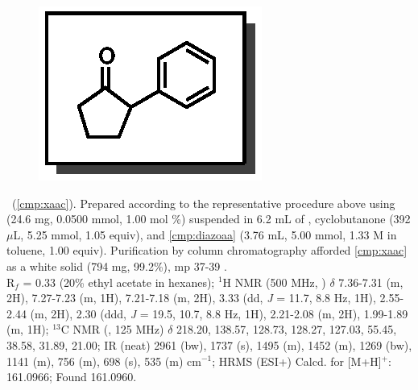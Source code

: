 \vspace{10pt}
\begin{figure}
  \vspace{-25pt}
  \begin{center}
    \includegraphics[scale=0.8]{chp_asymmetric/images/xaac}
  \end{center}
  \vspace{-30pt}
\end{figure}\noindent \textbf{\CMPxaac}\ (\ref{cmp:xaac}). Prepared
according to the representative procedure above using  (24.6 mg,
0.0500 mmol, 1.00 mol
\%) suspended in 6.2 mL of , cyclobutanone (392 $\mu$L, 5.25 mmol,
1.05 equiv), and \ref{cmp:diazoaa} (3.76 mL, 5.00 mmol, 1.33 M in toluene, 1.00
equiv). Purification by column chromatography afforded \ref{cmp:xaac} as a
white solid (794 mg, 99.2\%), mp 37-39 \degc. \\
R$_f$ = 0.33 (20\% ethyl acetate in hexanes); $^1$H NMR (500 MHz, )
$\delta$ 7.36-7.31 (m, 2H), 7.27-7.23 (m, 1H), 7.21-7.18 (m, 2H), 3.33 (dd, \textit{J} =
11.7, 8.8 Hz, 1H), 2.55-2.44 (m, 2H), 2.30 (ddd, \textit{J} = 19.5, 10.7, 8.8
Hz, 1H), 2.21-2.08 (m, 2H), 1.99-1.89 (m, 1H); $^{13}$C NMR (, 125
MHz) $\delta$ 218.20, 138.57, 128.73, 128.27, 127.03, 55.45, 38.58, 31.89,
21.00; IR (neat) 2961 (bw), 1737 (s), 1495 (m), 1452 (m), 1269 (bw), 1141 (m),
756 (m), 698 (s), 535 (m) cm$^{-1}$; HRMS (ESI+) Calcd.	for	
[M+H]$^+$: 161.0966; Found 161.0960.

